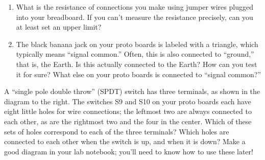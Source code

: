 \begin{enumerate}[wide]
\item What is the resistance of connections you make using jumper wires plugged into your breadboard.  If you can't measure the resistance precisely, can you at least set an upper limit?

\item The black banana jack on your proto boards is labeled with a triangle, which typically means ``signal common.'' Often, this is also connected to ``ground,'' that is, the Earth.  Is this actually connected to the Earth?  How can you test it for sure?  What else on your proto boards is connected to ``signal common?''

\end{enumerate}
\begin{enumerate}


\begin{minipage}{.75\textwidth}

\item A ``single pole double throw'' (SPDT) switch has three terminals, as shown in the diagram to the right.  The switches S9 and S10 on your proto boards each have eight little holes for wire connections; the leftmost two are always connected to each other, as are the rightmost two and the four in the center.  Which of these sets of holes correspond to each of the three terminals?  Which holes are connected to each other when the switch is up, and when it is down?  Make a good diagram in your lab notebook; you'll need to know how to use these later! \label{part_switches}
\end{minipage}
\begin{minipage}{.24\textwidth}
\end{minipage}


\end{enumerate}
